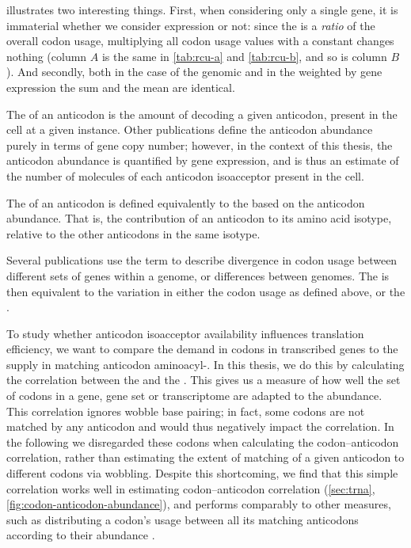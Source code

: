  illustrates two interesting things. First, when considering only
a single gene, it is immaterial whether we consider expression or not: since the
\rcu is a \emph{ratio} of the overall codon usage, multiplying all codon usage
values with a constant changes nothing (column \(A\) is the same in
\cref{tab:rcu-a} and \cref{tab:rcu-b}, and so is column \(B\)). And secondly,
both in the case of the genomic \rcu and in the \rcu weighted by gene
expression the sum \rcu and the mean \rcu are identical.

The  of an anticodon is the amount of \trna decoding
a given anticodon, present in the cell at a given instance. Other publications
define the anticodon abundance purely in terms of \trna gene copy number;
however, in the context of this thesis, the anticodon abundance is quantified by
\trna gene expression, and is thus an estimate of the number of \trna molecules
of each anticodon isoacceptor present in the cell.

The  of an anticodon is
defined equivalently to the \rcu based on the anticodon abundance. That is, the
contribution of an anticodon to its amino acid isotype, relative to the other
anticodons in the same isotype.

Several publications use the term  to describe divergence in codon usage between different sets of
genes within a genome, or differences between genomes. The \cub is then
equivalent to the variation in either the codon usage as defined above, or the
\rcu.

To study whether \trna anticodon isoacceptor availability influences translation
efficiency, we want to compare the demand in codons in transcribed genes to the
supply in matching anticodon aminoacyl-\trna[s]. In this thesis, we do this by
calculating the correlation between the \rcu and the \raa. This gives us a
measure of how well the set of codons in a gene, gene set or transcriptome are
adapted to the \trna abundance. This correlation ignores wobble base pairing; in
fact, some codons are not matched by any anticodon and would thus negatively
impact the correlation. In the following we disregarded these codons when
calculating the codon--anticodon correlation, rather than estimating the extent
of matching of a given anticodon to different codons via wobbling. Despite this
shortcoming, we find that this simple correlation works well in estimating
codon--anticodon correlation (\cref{sec:trna},
\cref{fig:codon-anticodon-abundance}), and performs comparably to other
measures, such as distributing a codon’s usage between all its matching \trna
anticodons according to their abundance \citep{Ikemura:1981}.

